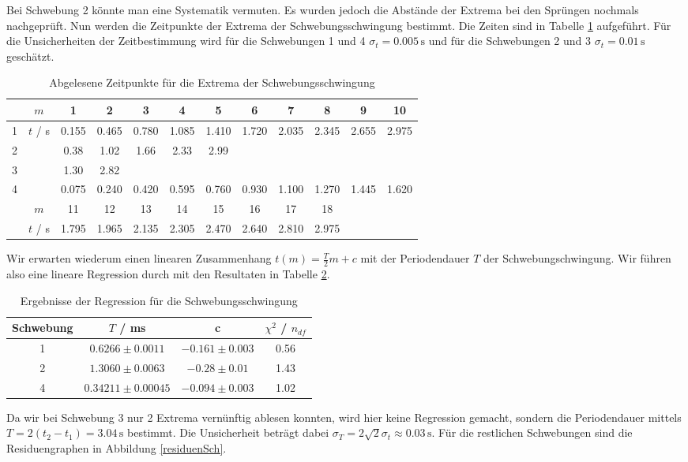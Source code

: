 Bei Schwebung 2 könnte man eine Systematik vermuten. Es wurden jedoch die Abstände der Extrema bei den Sprüngen nochmals nachgeprüft. Nun werden die Zeitpunkte der Extrema der Schwebungsschwingung bestimmt. Die Zeiten sind in Tabelle \ref{tabTimeSch} aufgeführt. Für die Unsicherheiten der Zeitbestimmung wird für die Schwebungen 1 und 4 $\sigma_t = 0.005 \, \mathrm s$ und für die Schwebungen 2 und 3 $\sigma_t = 0.01 \, \mathrm s$ geschätzt.
\begin{table}[H]
\centering
\begin{tabular}{c|c|cccccccccc}
& $m$ & 1 & 2 & 3 & 4 & 5 & 6 & 7 & 8 & 9 & 10 \\
\hline
1 & \multirow{4}{*}{$t$ / s} & 0.155 & 0.465 & 0.780 & 1.085 & 1.410 & 1.720 & 2.035 & 2.345 & 2.655 & 2.975 \\
\cline{1-1}\cline{3-12}
2 & & 0.38 & 1.02 & 1.66 & 2.33 & 2.99 & & & & & \\
\cline{1-1}\cline{3-12}
3 & & 1.30 & 2.82 & & & & & & & & \\
\cline{1-1}\cline{3-12}
\multirow{3}{*}{4}
& & 0.075 & 0.240 & 0.420 & 0.595 & 0.760 & 0.930 & 1.100 & 1.270 & 1.445 & 1.620 \\
\cline{2-12}
& $m$ & 11 & 12 & 13 & 14 & 15 & 16 & 17 & 18 & & \\
\cline{2-12}
& $t$ / s & 1.795 & 1.965 & 2.135 & 2.305 & 2.470 & 2.640 & 2.810 & 2.975 & & 
\end{tabular}
\caption{Abgelesene Zeitpunkte für die Extrema der Schwebungsschwingung}
\label{tabTimeSch}
\end{table}
Wir erwarten wiederum einen linearen Zusammenhang $t(m) = \frac T2m + c$ mit der Periodendauer $T$ der Schwebungschwingung. Wir führen also eine lineare Regression durch mit den Resultaten in Tabelle \ref{tabRegressionSch}.

\begin{table}[H]
\centering
\begin{tabular}{c|c|c|c}
Schwebung & $T$ / ms & c & $\chi^2$ / $n_{df}$ \\
\hline
1 & $ 0.6266 \pm 0.0011$ & $ -0.161 \pm 0.003$ & 0.56 \\
2 & $ 1.3060 \pm 0.0063$ & $ -0.28 \pm 0.01$ & 1.43 \\
4 & $ 0.34211 \pm 0.00045$ & $ -0.094 \pm 0.003$ & 1.02
\end{tabular}
\caption{Ergebnisse der Regression für die Schwebungsschwingung}
\label{tabRegressionSch}
\end{table}
Da wir bei Schwebung 3 nur 2 Extrema vernünftig ablesen konnten, wird hier keine Regression gemacht, sondern die Periodendauer mittels $T = 2(t_2-t_1) = 3.04 \, \mathrm s$ bestimmt. Die Unsicherheit beträgt dabei $\sigma_T = 2\sqrt{2} \sigma_t \approx 0.03 \, \mathrm s$. Für die restlichen Schwebungen sind die Residuengraphen in Abbildung \ref{residuenSch}.

